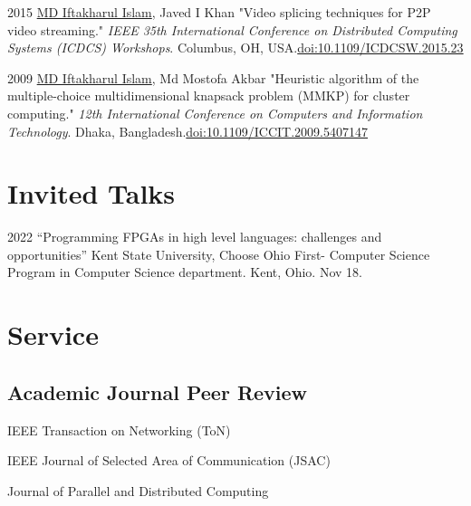 \documentclass[11pt,letterpaper]{report}
\newcommand{\listitemspace}{0.25em}
\renewenvironment{itemize}
{\begin{list}{}{\setlength{\leftmargin}{0em}
                \setlength{\parskip}{0em}
                \setlength{\itemsep}{\listitemspace}
                \setlength{\parsep}{\listitemspace}}}
{\end{list}}
\begin{document}
\begin{tablist}
        \item[2015] \tab{}\underline{MD Iftakharul Islam}, Javed I Khan "Video splicing techniques for P2P video streaming." \textit{IEEE 35th International Conference on Distributed Computing Systems (ICDCS) Workshops}. Columbus, OH, USA.\@ \href{https://ieeexplore.ieee.org/document/7165086}{doi:10.1109/ICDCSW.2015.23}

        \item[2009] \tab{}\underline{MD Iftakharul Islam}, Md Mostofa Akbar "Heuristic algorithm of the multiple-choice multidimensional knapsack problem (MMKP) for cluster computing." \textit{12th International Conference on Computers and Information Technology}. Dhaka, Bangladesh.\@ \href{https://ieeexplore.ieee.org/document/5407147}{doi:10.1109/ICCIT.2009.5407147}
        
    \end{tablist}




    \section*{Invited Talks}

    \begin{tablist}

        \item[2022] \tab{}\enquote{Programming FPGAs in high level languages: challenges and opportunities} Kent State University, Choose Ohio First- Computer Science Program in Computer Science department. Kent, Ohio. Nov 18.


    \end{tablist}

    \section*{Service}


    \subsection*{Academic Journal Peer Review}

	\begin{itemize}
		\item IEEE Transaction on Networking (ToN)
		\item IEEE Journal of Selected Area of Communication (JSAC)
		\item Journal of Parallel and Distributed Computing
	\end{itemize}
\end{document}
